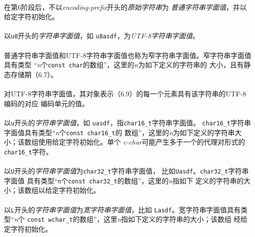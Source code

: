 \paragraph{}
在第6阶段后，不以\textit{encoding-prefix}开头的\textit{原始字符串}为
\textit{普通字符串字面值}，并以给定字符初始化。

\paragraph{}
以\texttt{u8}开头的\textit{字符串字面值}，如
\texttt{u8\qdbl{}asdf\qdbl}，为\textit{UTF-8字符串字面值}。

\paragraph{}
普通字符串字面值和UTF-8字符串字面值也称为窄字符串字面值。窄字符串字面值具有类型
``\textit{n}个\texttt{const char}的数组''，这里的\textit{n}为如下定义的字符串的
大小，且有静态存储期（6.7）。

\paragraph{}
对UTF-8字符串字面值，其对象表示（6.9）的每一个元素具有该字符串的UTF-8编码的对应
编码单元的值。

\paragraph{}
以\texttt{u}开头的\textit{字符串字面值}，如
\texttt{u\qdbl{}asdf\qdbl}，指\texttt{char16\_t}字符串字面值。
\texttt{char16\_t}字符串字面值具有类型``\textit{n}个\texttt{const char16\_t}的
数组''，这里的\textit{n}为如下定义的字符串大小；该数组使用给定字符初始化。单个
\textit{c-char}可能产生多于一个的代理对形式的\texttt{char16\_t}字符。

\paragraph{}
以\texttt{U}开头的\textit{字符串字面值}为\texttt{char32\_t}字符串字面值，
比如\texttt{U\qdbl{}asdf\qdbl}。\texttt{char32\_t}字符串字面值
具有类型``\texttt{n}个\texttt{const char32\_t}的数组''，这里的\textit{n}指如下
定义的字符串的大小；该数组以给定字符初始化。

\paragraph{}
以\texttt{L}开头的\textit{字符串字面值}为\textit{宽字符串字面值}，比如
\texttt{L\qdbl{}asdf\qdbl}。宽字符串字面值具有类型``\textit{n}个
\texttt{const wchar\_t}的数组''，这里\textit{n}指如下定义的字符串的大小；该数组
经给定字符初始化。

